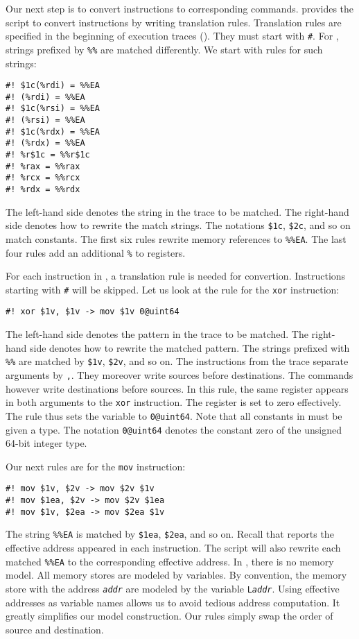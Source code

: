 \documentclass{amsproc}
\begin{document}
Our next step is to convert \xeightysix instructions to corresponding
\cryptoline commands. \cryptoline provides the \python script \tozdsl
to convert instructions by writing translation rules. Translation
rules are specified in the beginning of execution traces
(\nistzaddgas). They must start with \texttt{\#\!}. For \tozdsl,
strings prefixed by \texttt{\%\%} are matched differently. We start
with rules for such strings:
\begin{verbatim}
#! $1c(%rdi) = %%EA
#! (%rdi) = %%EA
#! $1c(%rsi) = %%EA
#! (%rsi) = %%EA
#! $1c(%rdx) = %%EA
#! (%rdx) = %%EA
#! %r$1c = %%r$1c
#! %rax = %%rax
#! %rcx = %%rcx
#! %rdx = %%rdx
\end{verbatim}
The left-hand side denotes the string in the trace to be matched. The
right-hand side denotes how to rewrite the match strings. The notations
\texttt{\$1c}, \texttt{\$2c}, and so on match constants. The first six
rules rewrite memory references to \texttt{\%\%EA}. The last four
rules add an additional \texttt{\%} to registers.

For each \xeightysix instruction in \nistzaddgas, a translation rule is
needed for convertion. Instructions starting with \texttt{\#} will be
skipped. Let us look at the rule for the \xeightysix \texttt{xor} instruction:
\begin{verbatim}
#! xor $1v, $1v -> mov $1v 0@uint64
\end{verbatim}
The left-hand side denotes the pattern in the trace to be matched. The
right-hand side denotes how to rewrite the matched pattern. The strings
prefixed with \texttt{\%\%} are matched by \texttt{\$1v},
\texttt{\$2v}, and so on. The \xeightysix instructions from the trace
separate arguments by \texttt{,}. They moreover write sources before
destinations. The \cryptoline commands however write destinations
before sources. In this rule, the same register appears in both
arguments to the \texttt{xor} instruction. The register is set to
zero effectively. The rule thus sets the \cryptoline variable to
\texttt{0@uint64}. Note that all constants in \cryptoline must be
given a type. The notation \texttt{0@uint64} denotes the constant zero
of the unsigned 64-bit integer type.

Our next rules are for the \xeightysix \texttt{mov} instruction:
\begin{verbatim}
#! mov $1v, $2v -> mov $2v $1v
#! mov $1ea, $2v -> mov $2v $1ea
#! mov $1v, $2ea -> mov $2ea $1v
\end{verbatim}
The string \texttt{\%\%EA} is matched by \texttt{\$1ea},
\texttt{\$2ea}, and so on. Recall that \itrace reports the effective
address appeared in each instruction. The script \tozdsl will also
rewrite each matched \texttt{\%\%EA} to the corresponding effective
address. In \cryptoline, there is no memory model. All memory stores
are modeled by \cryptoline variables. By convention, the memory store
with the address \texttt{\textit{addr}} are modeled by the variable 
\texttt{L\textit{addr}}. Using effective addresses as variable names
allows us to avoid tedious address computation. It greatly simplifies
our model construction. Our rules simply swap the order of source and
destination.
\end{document}
